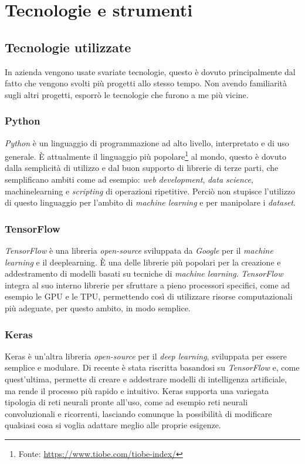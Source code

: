 \section{Tecnologie e strumenti}

\subsection{Tecnologie utilizzate}\noindent
In azienda vengono usate svariate tecnologie, questo è dovuto principalmente dal fatto che vengono svolti più progetti allo stesso tempo. Non avendo familiarità sugli altri progetti, esporrò le tecnologie che furono a me più vicine.
\subsubsection*{Python}\noindent
\textit{Python} è un linguaggio di programmazione ad alto livello, interpretato e di uso generale.
È attualmente il linguaggio più popolare\footnote{Fonte: \href{https://www.tiobe.com/tiobe-index/}{https://www.tiobe.com/tiobe-index/}} al mondo, questo è dovuto dalla semplicità di utilizzo e dal buon supporto di librerie di terze parti, che semplificano ambiti come ad esempio: \textit{web development}, \textit{data science}, \gls{machinelearning} e \textit{scripting} di operazioni ripetitive.
Perciò non stupisce l'utilizzo di questo linguaggio per l'ambito di \textit{machine learning} e per manipolare i \textit{dataset}.
\subsubsection*{TensorFlow}\noindent
\textit{TensorFlow} è una libreria \textit{open-source} sviluppata da \textit{Google} per il \textit{machine learning} e il \gls{deeplearning}.
È una delle librerie più popolari per la creazione e addestramento di modelli basati su tecniche di \textit{machine learning}.
\textit{TensorFlow} integra al suo interno librerie per sfruttare a pieno processori specifici, come ad esempio le \gls{GPU} e le \gls{TPU}, permettendo così di utilizzare risorse computazionali più adeguate, per questo ambito, in modo semplice.
\subsubsection*{Keras}\noindent
Keras è un'altra libreria \textit{open-source} per il \textit{deep learning}, sviluppata per essere semplice e modulare.
Di recente è stata riscritta basandosi su \textit{TensorFlow} e, come quest'ultima, permette di creare e addestrare modelli di intelligenza artificiale, ma rende il processo più rapido e intuitivo.
Keras supporta una variegata tipologia di reti neurali pronte all'uso, come ad esempio reti neurali convoluzionali e ricorrenti, lasciando comunque la possibilità di modificare qualsiasi cosa si voglia adattare meglio alle proprie esigenze.

